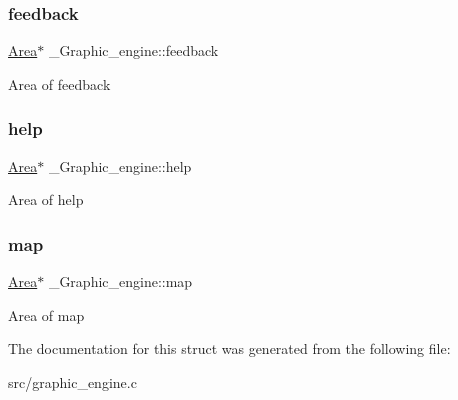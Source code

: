 \subsubsection{\texorpdfstring{feedback}{feedback}}
{\footnotesize\ttfamily \hyperlink{screen_8h_acfdfc42f6522d75fa3c16713afde8127}{Area}$\ast$ \+\_\+\+Graphic\+\_\+engine\+::feedback}

Area of feedback \mbox{\label{struct__Graphic__engine_ade1d3e95ad6def427f613a4a2d101875}} 
\subsubsection{\texorpdfstring{help}{help}}
{\footnotesize\ttfamily \hyperlink{screen_8h_acfdfc42f6522d75fa3c16713afde8127}{Area}$\ast$ \+\_\+\+Graphic\+\_\+engine\+::help}

Area of help \mbox{\label{struct__Graphic__engine_a1ea06bb881d335da8c31d63b3e834bdb}} 
\subsubsection{\texorpdfstring{map}{map}}
{\footnotesize\ttfamily \hyperlink{screen_8h_acfdfc42f6522d75fa3c16713afde8127}{Area}$\ast$ \+\_\+\+Graphic\+\_\+engine\+::map}

Area of map 

The documentation for this struct was generated from the following file\+:\begin{DoxyCompactItemize}
\item 
src/graphic\+\_\+engine.\+c\end{DoxyCompactItemize}
